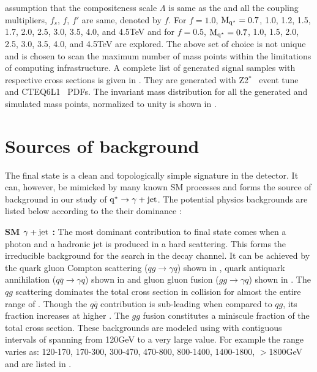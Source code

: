 assumption that the compositeness scale $\Lambda$ is same as the \mqstar and all the coupling multipliers, $f_{s}$, $f$, $f'$ are same, denoted by 
$f$. For $f=1.0$, $\mathrm{M_{q^\star}}=0.7$, 1.0, 1.2, 1.5, 1.7, 2.0, 2.5, 3.0, 3.5, 4.0, and 4.5\unit{TeV} and for $f=0.5$, $\mathrm{M_{q^\star}}=0.7$, 1.0, 1.5, 2.0, 
2.5, 3.0, 3.5, 4.0, and 4.5\unit{TeV} are explored. The above set of choice is not unique and is chosen to scan the maximum number of mass points
 within the limitations of computing infrastructure. A complete list of \pythia  generated signal  samples with respective cross sections is 
given in \tab{\ref{Table:SigSamples}}. They are generated with Z2$^{\ast}$~\cite{Chatrchyan:2011id,Field:2010bc} event tune and 
CTEQ6L1~\cite{Pumplin:2002vw,Martin:2009iq} \gls{PDFs}. The invariant mass distribution for all the generated and simulated \qstar mass points, normalized to unity is shown in \fig{\ref{Fig:QstarShapes}}.

\section{Sources of background}
The \gamjet final state is a clean and topologically simple signature in the detector. It can, however, be mimicked by many known SM processes and 
forms the source of background in our study of $\mathrm{q^\star}\to\gamma+\mathrm{jet}$. The potential physics backgrounds are listed below according to the their dominance :

{\bf SM \boldmath$\gamma+\mathrm{jet}$ : } The most dominant contribution to \gamjet final state comes when a photon and a hadronic jet is produced 
in a hard scattering. This forms the irreducible background for the search \qstar in the \gamjet decay channel. It can be achieved by the 
quark gluon Compton scattering ($qg\rightarrow\gamma{q}$) shown in \fig{\ref{fig:qstarGJa}}, quark antiquark annihilation 
($q\bar{q}\rightarrow\gamma{q}$) shown in \fig{\ref{fig:qstarGJb}} and gluon gluon fusion ($gg\rightarrow\gamma{q}$) shown in \fig{\ref{fig:qstarGJc}}.
The $qg$ scattering dominates the total \gamjet cross section in \pp collision for almost the entire range of \ptx{\gamma}. Though the $q\bar{q}$ 
contribution is sub-leading when compared to $qg$, its fraction increases at higher \ptx{\gamma}. The $gg$ fusion constitutes a miniscule
fraction of the total \gamjet cross section. These backgrounds are modeled using \pythia with contiguous intervals of \ptx{\gamma} spanning from 
120\unit{GeV} to a very large value. For example the \ptx{\gamma} range varies as: 120-170, 170-300, 300-470, 470-800, 800-1400, 1400-1800, 
$>$1800\unit{GeV} and are listed in \tab{\ref{Table:BkgSamples}}.

